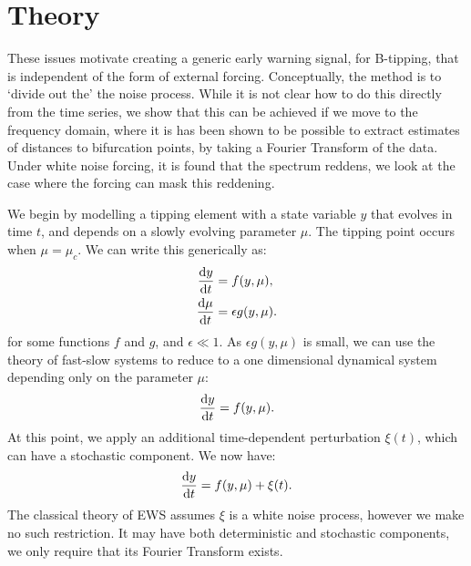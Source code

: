 \section{Theory}
\label{sec:theory}
These issues motivate creating a generic early warning signal, 
for B-tipping, that is 
independent of the form of external forcing. Conceptually,
the method is to `divide out the' the noise process.
While it is not clear
how to do this directly from the time series, we show that this can be achieved if we move
to the frequency domain, where it is has been shown to be possible
to extract estimates of distances to bifurcation 
points\cite{Kleinen2003}, by taking a Fourier Transform of the data. 
Under white noise forcing, it is found that the spectrum reddens\cite{Kefi2014,Dakos2012c}, we look at the case where the forcing 
can mask this reddening.

We begin by modelling a tipping element with a state variable $y$ that evolves in time $t$, and depends on a slowly evolving parameter $\mu$.  The tipping point occurs when $\mu=\mu_c$.
We can  write this generically as:
\begin{eqnarray}
\label{eq:full_syste}
    \dv{y}{t} &= f(y,\mu),\\
    \dv{\mu}{t} &= \epsilon g(y,\mu).
\end{eqnarray}
for some functions $f$ and $g$, and $\epsilon \ll 1$.
As $\epsilon g(y,\mu)$ is small, we can use the theory of fast-slow systems\cite{Kuehn2011} to reduce to a one
dimensional dynamical system depending only on the parameter $\mu$:
\begin{equation}
  \label{eq:1d_dynamical_sys}
  \dv{y}{t} = f(y,\mu).
\end{equation}
At this point, we apply an additional time-dependent perturbation $\xi(t)$, which can have a stochastic component. We now have:
\begin{equation}
  \label{eq:1d_dyn_sys_forced}
  \dv{y}{t} = f(y,\mu) + \xi(t).
\end{equation}
The classical theory of EWS assumes $\xi$ is a white noise process, however we make no such restriction. It may have both
deterministic and stochastic components, we only require that its 
Fourier Transform exists.

